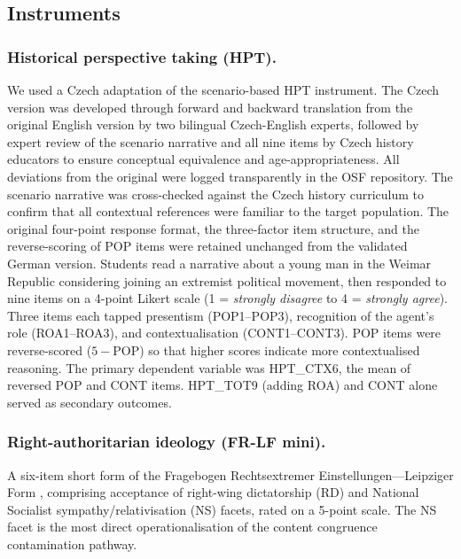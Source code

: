 \documentclass[pdflatex,sn-apa]{sn-jnl}%
\begin{document}
\subsection{Instruments}\label{subsec:instruments}

\subsubsection{Historical perspective taking (HPT).}\label{subsubsec:hpt}

We used a Czech adaptation of the \citet{Hartmann2008} scenario-based HPT instrument. The Czech version was developed through forward and backward translation from the original English version by two bilingual Czech-English experts, followed by expert review of the scenario narrative and all nine items by Czech history educators to ensure conceptual equivalence and age-appropriateness. All deviations from the original were logged transparently in the OSF repository. The scenario narrative was cross-checked against the Czech history curriculum to confirm that all contextual references were familiar to the target population. The original four-point response format, the three-factor item structure, and the reverse-scoring of POP items were retained unchanged from the validated German version. Students read a narrative about a young man in the Weimar Republic considering joining an extremist political movement, then responded to nine items on a 4-point Likert scale (1 = \emph{strongly disagree} to 4 = \emph{strongly agree}). Three items each tapped presentism (POP1--POP3), recognition of the agent's role (ROA1--ROA3), and contextualisation (CONT1--CONT3). POP items were reverse-scored ($5 - \text{POP}$) so that higher scores indicate more contextualised reasoning. The primary dependent variable was HPT\_CTX6, the mean of reversed POP and CONT items. HPT\_TOT9 (adding ROA) and CONT alone served as secondary outcomes.

\subsubsection{Right-authoritarian ideology (FR-LF mini).}\label{subsubsec:frlf}

A six-item short form of the Fragebogen Rechtsextremer Einstellungen---Leipziger Form \citep{Decker2013}, comprising acceptance of right-wing dictatorship (RD) and National Socialist sympathy/relativisation (NS) facets, rated on a 5-point scale. The NS facet is the most direct operationalisation of the content congruence contamination pathway.
\end{document}
